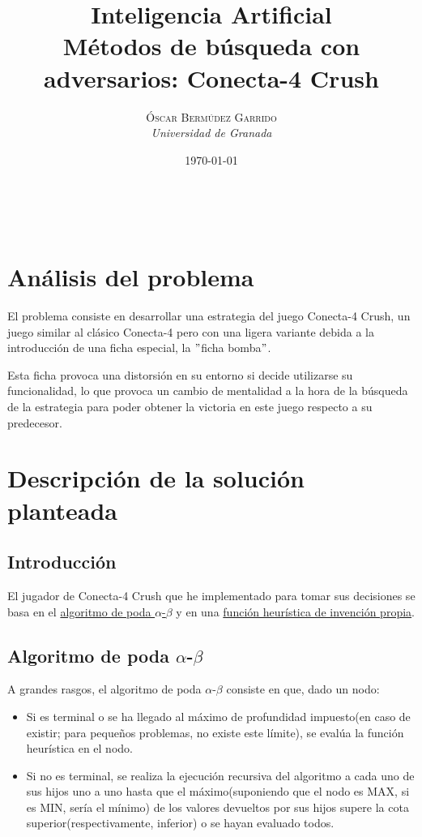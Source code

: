 \documentclass[a4paper, 11pt]{article}
\title{\textbf{Inteligencia Artificial}\\ %
Métodos de búsqueda con adversarios: Conecta-4 Crush} %
\author{\textsc{Óscar Bermúdez Garrido} %
\\{\textit{Universidad de Granada}}} %
\date{\today} %
\makeatletter
\renewcommand{\maketitle}{
  \begin{flushright} %
  
  {\LARGE\@title} %
  
  \vspace{50pt} %
  
  {\large\@author} %
  \\\@date %
  \vspace{40pt} %
  \end{flushright}
}
\makeatother
\begin{document}
\maketitle %
{\parskip=2pt
  \tableofcontents
}
\pagebreak


\section{Análisis del problema}
	El problema consiste en desarrollar una estrategia del juego Conecta-4 Crush, un juego similar
	al clásico Conecta-4 pero con una ligera variante debida a la introducción de una ficha especial,
	la $"$ficha bomba$"$.
	
	Esta ficha provoca una distorsión en su entorno si decide utilizarse su funcionalidad, lo que
	provoca un cambio de mentalidad a la hora de la búsqueda de la estrategia para poder obtener
	la victoria en este juego respecto a su predecesor.

\section{Descripción de la solución planteada}
	\subsection{Introducción}
		El jugador de Conecta-4 Crush que he implementado para tomar sus decisiones se basa en
		el \href{https://en.wikipedia.org/wiki/Alpha\%E2\%80\%93beta\_pruning}{algoritmo de poda
		$\alpha$-$\beta$} y en una \hyperref[sec: h(x)]{función heurística de invención propia}.
		
	\subsection{Algoritmo de poda $\alpha$-$\beta$}
		
		A grandes rasgos, el algoritmo de poda $\alpha$-$\beta$ consiste en que, dado un nodo:
		\begin{itemize}
			\item Si es terminal o se ha llegado al máximo de profundidad impuesto(en caso de
			existir; para pequeños problemas, no existe este límite), se evalúa la función
			heurística en el nodo.
			
			\item Si no es terminal, se realiza la ejecución recursiva del algoritmo a cada uno
			de sus hijos uno a uno hasta que el máximo(suponiendo que el nodo es MAX, si es
			MIN, sería el mínimo) de los valores devueltos por sus hijos supere la cota
			superior(respectivamente, inferior) o se hayan evaluado todos.
		\end{itemize}
		
\end{document}
